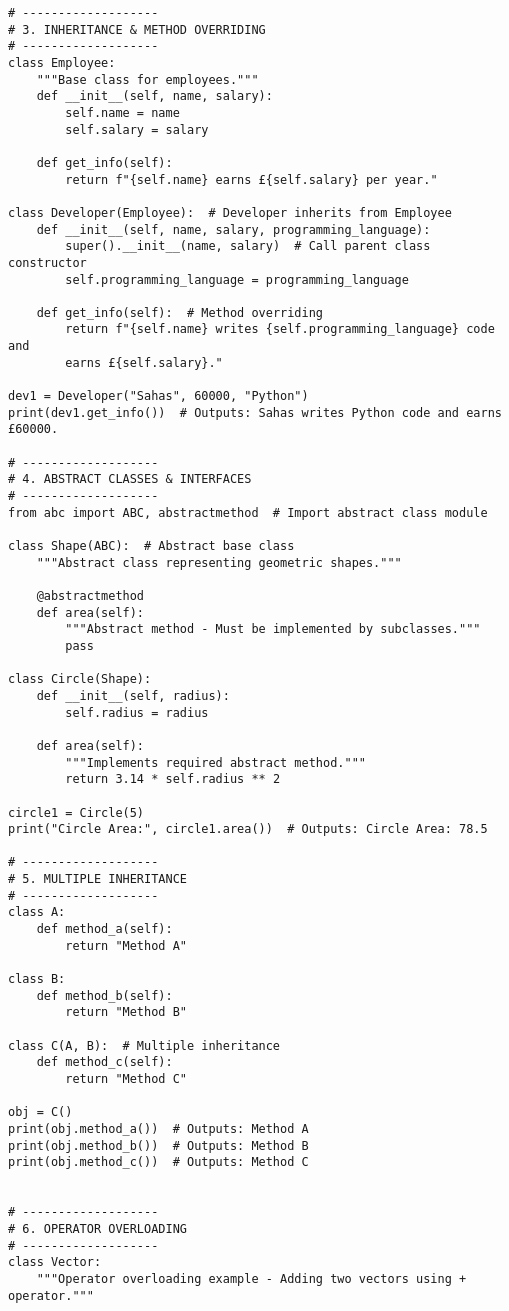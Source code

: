 \begin{verbatim}
# -------------------
# 3. INHERITANCE & METHOD OVERRIDING
# -------------------
class Employee:
    """Base class for employees."""
    def __init__(self, name, salary):
        self.name = name
        self.salary = salary

    def get_info(self):
        return f"{self.name} earns £{self.salary} per year."

class Developer(Employee):  # Developer inherits from Employee
    def __init__(self, name, salary, programming_language):
        super().__init__(name, salary)  # Call parent class constructor
        self.programming_language = programming_language

    def get_info(self):  # Method overriding
        return f"{self.name} writes {self.programming_language} code and 
        earns £{self.salary}."

dev1 = Developer("Sahas", 60000, "Python")
print(dev1.get_info())  # Outputs: Sahas writes Python code and earns £60000.

# -------------------
# 4. ABSTRACT CLASSES & INTERFACES
# -------------------
from abc import ABC, abstractmethod  # Import abstract class module

class Shape(ABC):  # Abstract base class
    """Abstract class representing geometric shapes."""
    
    @abstractmethod
    def area(self):
        """Abstract method - Must be implemented by subclasses."""
        pass

class Circle(Shape):
    def __init__(self, radius):
        self.radius = radius

    def area(self):
        """Implements required abstract method."""
        return 3.14 * self.radius ** 2

circle1 = Circle(5)
print("Circle Area:", circle1.area())  # Outputs: Circle Area: 78.5

# -------------------
# 5. MULTIPLE INHERITANCE
# -------------------
class A:
    def method_a(self):
        return "Method A"

class B:
    def method_b(self):
        return "Method B"

class C(A, B):  # Multiple inheritance
    def method_c(self):
        return "Method C"

obj = C()
print(obj.method_a())  # Outputs: Method A
print(obj.method_b())  # Outputs: Method B
print(obj.method_c())  # Outputs: Method C


# -------------------
# 6. OPERATOR OVERLOADING
# -------------------
class Vector:
    """Operator overloading example - Adding two vectors using + operator."""
    

\end{verbatim}
